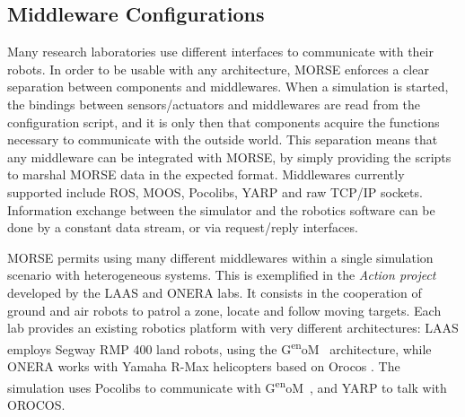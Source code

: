 \documentclass{llncs}
\def\genom{G\textsuperscript{en}oM~}
\begin{document}
\subsection{Middleware Configurations}
\label{section:middlewares}

Many research laboratories use different interfaces to communicate with their
robots. In order to be usable with any architecture, MORSE enforces a
clear separation between components and middlewares. When a simulation is started,
the bindings between sensors/actuators and middlewares are read from the
configuration script, and it is only then that components acquire the functions
necessary to communicate with the outside world.
This separation means that any middleware can be integrated with MORSE, by
simply providing the scripts to marshal MORSE data in the expected format.
Middlewares currently supported include ROS, MOOS, Pocolibs, YARP and
raw TCP/IP sockets.
Information exchange between the simulator and the robotics software can be
done by a constant data stream, or via request/reply interfaces.

MORSE permits using many different middlewares within a single simulation
scenario with heterogeneous systems. This is exemplified in the \emph{Action
project} \cite{6106782} developed by the LAAS and ONERA labs.
It consists in the cooperation of ground and air robots to patrol a zone,
locate and follow moving targets.
Each lab provides an existing robotics platform with very different
architectures: LAAS employs Segway RMP 400 land robots, using the \genom
\cite{MALLET-2011-599677} architecture, while ONERA works with Yamaha R-Max
helicopters based on Orocos \cite{orocos2003}. The simulation uses Pocolibs to
communicate with \genom, and YARP to talk with OROCOS.

\end{document}
